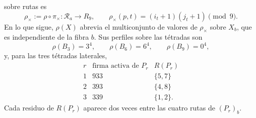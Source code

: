 sobre rutas es
\begin{equation}
 \rho_\times:=\rho\circ\pi_\times:\mathcal R_a\longrightarrow R_9,
 \qquad
 \rho_\times(p,t)=(i_t+1)(j_t+1)\pmod9.
 \label{eq:residuo-producto-rutas-fano-semillas-rev3}
\end{equation}
En lo que sigue, \(\rho(X)\) abrevia el multiconjunto de valores de
\(\rho_\times\) sobre \(X_b\), que es independiente de la fibra \(b\). Sus
perfiles sobre las tétradas son
\[
 \rho(B_3)=3^4,
 \qquad
 \rho(B_6)=6^4,
 \qquad
 \rho(B_9)=0^4,
\]
y, para las tres tétradas laterales,
\begin{equation}
 \begin{array}{c|c|c}
 r&\text{firma activa de }P_r&R(P_r)\\
 \hline
 1&933&\{5,7\}\\
 2&393&\{4,8\}\\
 3&339&\{1,2\}.
 \end{array}
 \label{eq:perfiles-laterales-fano-semillas-rev3}
\end{equation}
Cada residuo de \(R(P_r)\) aparece dos veces entre las cuatro rutas de
\((P_r)_b\).

